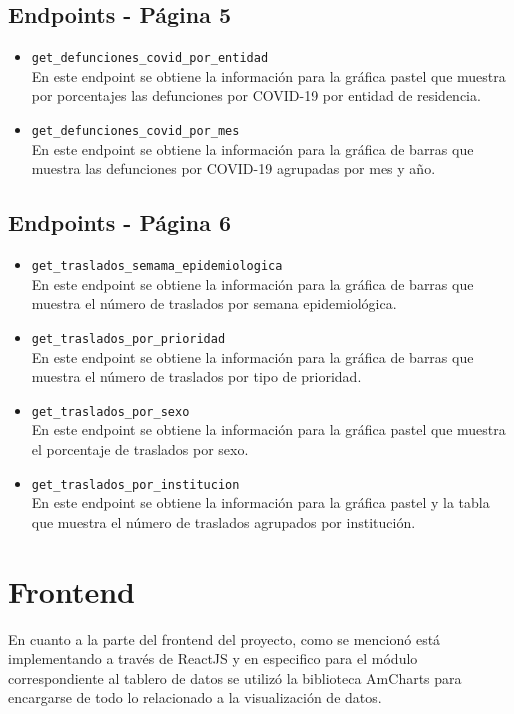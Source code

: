 \subsection{Endpoints - Página 5}
\begin{itemize}
    \item \texttt{get\_defunciones\_covid\_por\_entidad}\\
    En este endpoint se obtiene la información para la gráfica pastel que muestra por porcentajes las defunciones por COVID-19 por entidad de residencia.

    \item \texttt{get\_defunciones\_covid\_por\_mes}\\
    En este endpoint se obtiene la información para la gráfica de barras que muestra las defunciones por COVID-19 agrupadas por mes y año.
    
\end{itemize}

\subsection{Endpoints - Página 6}
\begin{itemize}
    \item \texttt{get\_traslados\_semama\_epidemiologica}\\
    En este endpoint se obtiene la información para la gráfica de barras que muestra el número de traslados por semana epidemiológica.

    \item \texttt{get\_traslados\_por\_prioridad}\\
    En este endpoint se obtiene la información para la gráfica de barras que muestra el número de traslados por tipo de prioridad.

    \item \texttt{get\_traslados\_por\_sexo}\\
    En este endpoint se obtiene la información para la gráfica pastel que muestra el porcentaje de traslados por sexo.

    \item \texttt{get\_traslados\_por\_institucion}\\
    En este endpoint se obtiene la información para la gráfica pastel y la tabla que muestra el número de traslados agrupados por institución.
\end{itemize}

\section{Frontend}\label{sec:frontent}
En cuanto a la parte del frontend del proyecto, como se mencionó está implementando a través de ReactJS y en especifico para el módulo correspondiente al tablero de datos se utilizó la biblioteca AmCharts para encargarse de todo lo relacionado a la visualización de datos.\\

